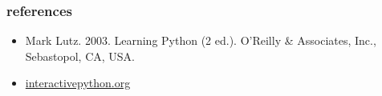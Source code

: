 \documentclass{beamer}
\begin{document}
%         




\begin{frame}
 \frametitle{references}
 \begin{itemize}
  \item Mark Lutz. 2003. Learning Python (2 ed.). O'Reilly \& Associates, Inc., Sebastopol, CA, USA.
  \item \href{http://interactivepython.org}{interactivepython.org}
 \end{itemize}
\end{frame}
\end{document}
